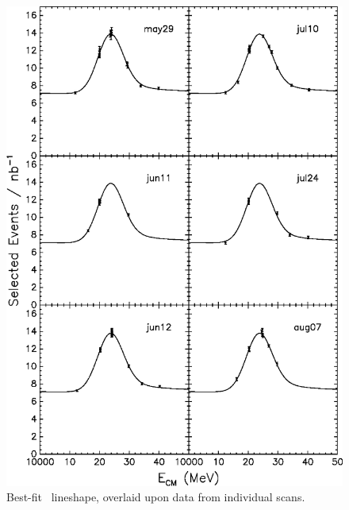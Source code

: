 \documentclass{cornell}
\begin{document}
\begin{figure}[p]
  \begin{center}
    \includegraphics[width=0.9\linewidth]{allscansss}
  \end{center}
  \caption[Best-fit lineshape for each \uss\ scan]{\label{allscansss} Best-fit \uss\ lineshape,
  overlaid upon data from individual scans.}
\end{figure}
\end{document}
